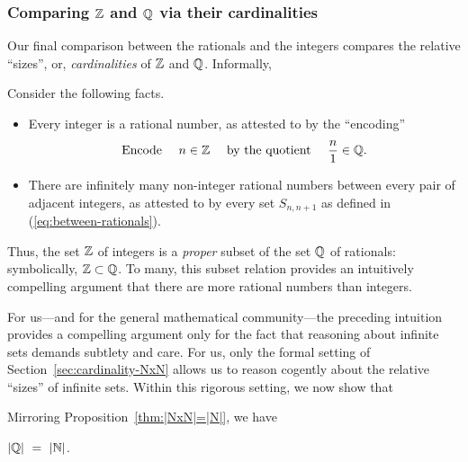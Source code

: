 \subsubsection{Comparing $\mathbb{Z}$ and $\Q$ via their cardinalities}
\label{sec:Q-Z-cardinality}

Our final comparison between the rationals and the integers compares
the relative ``sizes'', or, {\em cardinalities} of $\mathbb{Z}$ and $\Q$.
Informally, 

\hspace*{.35in}{\it Are there ``more'' rationals than integers?}

\medskip

\noindent Consider the following facts.
\begin{itemize}
\item
Every integer is a rational number, as attested to by the ``encoding''
\begin{equation}
\label{eq:ZintoQ}
\mbox{Encode } \ \ \ n \in \mathbb{Z} \ \ \ \mbox{ by the quotient } \ \ \ {n
  \over 1} \in \mathbb{Q} .
\end{equation}

\item
There are infinitely many non-integer rational numbers between every
pair of adjacent integers, as attested to by every set $S_{n,n+1}$ as
defined in (\ref{eq:between-rationals}).
\end{itemize}
Thus, the set $\mathbb{Z}$ of integers is a {\em proper} subset of the set
$\Q$ of rationals: symbolically, $\mathbb{Z} \subset \mathbb{Q}$.  To many, this
subset relation provides an intuitively compelling argument that
there are more rational numbers than integers.

For us---and for the general mathematical community---the preceding
intuition provides a compelling argument only for the fact that
reasoning about infinite sets demands subtlety and care.  For us, only
the formal setting of Section~\ref{sec:cardinality-NxN} allows us to
reason cogently about the relative ``sizes'' of infinite sets.  Within
this rigorous setting, we now show that

\hspace*{.35in}{\em the set $\N$ has the same cardinality as the set $\Q$.}

\noindent
Mirroring Proposition~\ref{thm:|NxN|=|N|}, we have

\begin{prop}
\label{thm:|Q|=|N|}
$|\mathbb{Q}| \ = \ |\mathbb{N}|$.
\end{prop}

